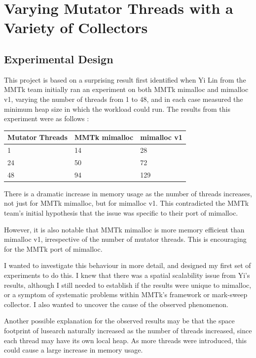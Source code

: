 \documentclass{article}
\begin{document}
\section{Varying Mutator Threads with a Variety of Collectors}
\subsection{Experimental Design}
This project is based on a surprising result first identified when Yi Lin from the MMTk team initially ran an experiment on both MMTk mimalloc and mimalloc v1, varying the number of threads from 1 to 48, and in each case measured the minimum heap size in which the workload could run. The results from this experiment were as follows \cite{issue-688}:
\begin{center}
    \begin{tabular}{|l|l|l|}
        \hline
        Mutator Threads & MMTk mimalloc & mimalloc v1\\
        \hline
        1 & 14 & 28\\
        \hline
        24 & 50 & 72\\
        \hline
        48 & 94 & 129\\
        \hline
    \end{tabular}
\end{center}

There is a dramatic increase in memory usage as the number of threads increases, not just for MMTk mimalloc, but for mimalloc v1. This contradicted the MMTk team's initial hypothesis that the issue was specific to their port of mimalloc.

However, it is also notable that MMTk mimalloc is more memory efficient than mimalloc v1, irrespective of the number of mutator threads. This is encouraging for the MMTk port of mimalloc.

I wanted to investigate this behaviour in more detail, and designed my first set of experiments to do this. I knew that there was a spatial scalability issue from Yi's results, although I still needed to establish if the results were unique to mimalloc, or a symptom of systematic problems within MMTk's framework or mark-sweep collector. I also wanted to uncover the cause of the observed phenomenon.

Another possible explanation for the observed results may be that the space footprint of lusearch naturally increased as the number of threads increased, since each thread may have its own local heap. As more threads were introduced, this could cause a large increase in memory usage.
\end{document}
